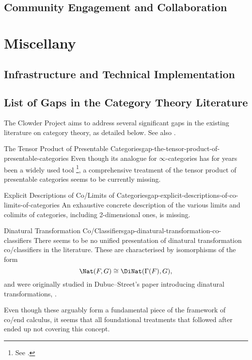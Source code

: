 \subsection{Community Engagement and Collaboration}\label{subsection-community-engagement-and-collaboration}
\section{Miscellany}\label{section-miscellany}
\subsection{Infrastructure and Technical Implementation}\label{subsection-infrastructure-and-technical-implementation}
\subsection{List of Gaps in the Category Theory Literature}\label{subsection-list-of-gaps-in-the-category-theory-literature}
The Clowder Project aims to address several significant gaps in the existing literature on category theory, as detailed below. See also \cite{MO494959}.
\begin{gap}{The Tensor Product of Presentable Categories}{gap-the-tensor-product-of-presentable-categories}%
    Even though its analogue for $\infty$-categories has for years been a widely used tool%
    \footnote{%
        See \cite{MO490557}.
        \par\vspace*{\TCBBoxCorrection}
    }, %
    a comprehensive treatment of the tensor product of presentable categories seems to be currently missing.
\end{gap}
\begin{gap}{Explicit Descriptions of Co/Limits of Categories}{gap-explicit-descriptions-of-co-limits-of-categories}%
    An exhaustive concrete description of the various limits and colimits of categories, including 2-dimensional ones, is missing.
\end{gap}
\begin{gap}{Dinatural Transformation Co/Classifiers}{gap-dinatural-transformation-co-classifiers}%
    There seems to be no unified presentation of dinatural transformation co/classifiers in the literature. These are characterised by isomorphisms of the form
    \[
        \Nat(F,G)%
        \cong%
        \DiNat(\Gamma(F),G),%
    \]%
    and were originally studied in Dubuc--Street's paper introducing dinatural transformations, \cite{dubuc-street-dinatural-transformations}.

    \indent Even though these arguably form a fundamental piece of the framework of co/end calculus, it seems that all foundational treatments that followed after ended up not covering this concept.
\end{gap}
